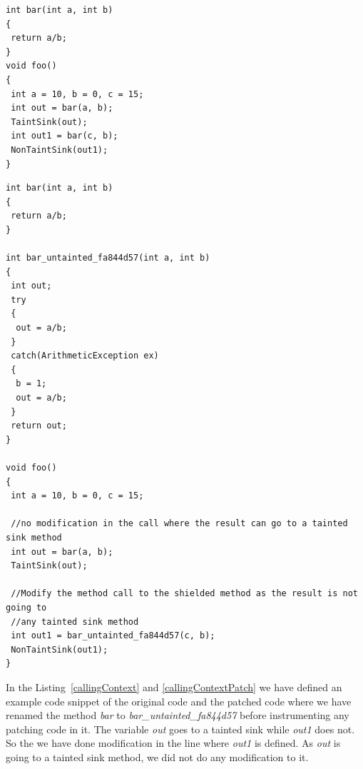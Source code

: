 \lstset{language=Java, caption = Same method calling in different scenario,
label=callingContext}
\begin{lstlisting}
int bar(int a, int b)
{
 return a/b;
}
void foo()
{
 int a = 10, b = 0, c = 15;
 int out = bar(a, b);
 TaintSink(out);
 int out1 = bar(c, b);
 NonTaintSink(out1);
}
\end{lstlisting}


\lstset{language=Java, caption = Mehod name modification for different calling
context, label=callingContextPatch}

\begin{lstlisting}
int bar(int a, int b)
{
 return a/b;
}

int bar_untainted_fa844d57(int a, int b)
{
 int out;
 try
 {
  out = a/b;
 }
 catch(ArithmeticException ex)
 {
  b = 1;
  out = a/b;
 }
 return out;
}

void foo()
{
 int a = 10, b = 0, c = 15;
 
 //no modification in the call where the result can go to a tainted sink method
 int out = bar(a, b);
 TaintSink(out);
 
 //Modify the method call to the shielded method as the result is not going to
 //any tainted sink method 
 int out1 = bar_untainted_fa844d57(c, b);
 NonTaintSink(out1);
}

\end{lstlisting}

In the Listing~\ref{callingContext} and \ref{callingContextPatch} we have
defined an example code snippet of the original code and the patched code where
we have renamed the method \emph{bar} to \emph{bar\_untainted\_fa844d57}
before instrumenting any patching code in it. The variable \emph{out} goes to a
tainted sink while \emph{out1} does not. So the we have done modification in the
line where \emph{out1} is defined. As \emph{out} is going to a tainted sink
method, we did not do any modification to it.






